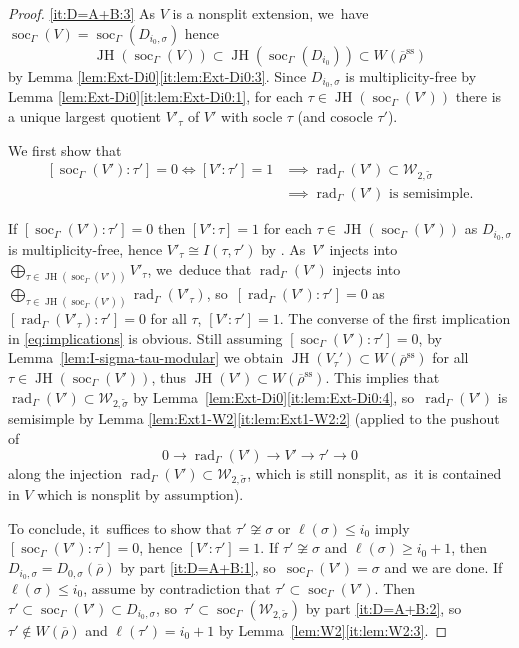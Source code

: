 \documentclass[JEP,XML,SOM,Unicode,NoFloatCountersInSection, NoEqCountersInSection,published]{cedram}
\let\wt\widetilde
\newcommand{\cW}{\mathcal{W}}
\renewcommand{\ss}{\mathrm{ss}}
\newcommand{\brho}{\overline{\rho}}
\DeclareMathOperator{\JH}{\mathrm{JH}}
\DeclareMathOperator{\rad}{rad}
\DeclareMathOperator{\soc}{soc}
\theoremstyle{plain}
\theoremstyle{definition}
\begin{document}
\begin{proof}
\eqref{it:D=A+B:3}
As $V$ is a nonsplit extension, we~have $\soc_{\Gamma}(V) = \soc_{\Gamma}(D_{i_0,\sigma})$ hence
\[
\JH(\soc_{\Gamma}(V)) \subset \JH(\soc_{\Gamma}(D_{i_0})) \subset W(\brho^\ss)
\]
by Lemma \ref{lem:Ext-Di0}\eqref{it:lem:Ext-Di0:3}.
Since $D_{i_0,\sigma}$ is multiplicity-free by Lemma \ref{lem:Ext-Di0}\eqref{it:lem:Ext-Di0:1}, for each $\tau\in \JH(\soc_{\Gamma}(V'))$ there is a unique largest quotient $V'_{\tau}$ of $V'$ with socle $\tau$ (and cosocle $\tau'$).

We first show that
\begin{equation}
\label{eq:implications}
\begin{aligned}
{}[\soc_{\Gamma}(V'):\tau'] = 0 \iff [V':\tau'] = 1
&\implies\rad_{\Gamma}(V') \subset \mathcal{W}_{2,\wt\sigma}\\
&\implies\text{$\rad_{\Gamma}(V')$ is semisimple}.
\end{aligned}
\end{equation}

If $[\soc_{\Gamma}(V'):\tau'] = 0$ then $[V':\tau]=1$ for each $\tau \in \JH(\soc_{\Gamma}(V'))$ as $D_{i_0,\sigma}$ is multiplicity-free, hence $V'_\tau \cong I(\tau,\tau')$ by \cite[Cor.\,3.12]{BP}. As~$V'$ injects into $\bigoplus_{\tau\in\JH(\soc_{\Gamma}(V'))} V'_{\tau}$, we~deduce that $\rad_{\Gamma}(V')$ injects into $\bigoplus_{\tau\in\JH(\soc_{\Gamma}(V'))} \rad_{\Gamma}(V'_{\tau})$, so~$[\rad_{\Gamma}(V'):\tau'] = 0$ as $[\rad_{\Gamma}(V'_\tau):\tau'] = 0$ for all $\tau$, \ie $[V':\tau'] = 1$.
The converse of the first implication in \eqref{eq:implications} is obvious.
Still assuming $[\soc_{\Gamma}(V'):\tau'] = 0$, by Lemma~\ref{lem:I-sigma-tau-modular} we obtain $\JH(V_{\tau}')\subset W(\brho^\ss)$ for all $\tau \in \JH(\soc_{\Gamma}(V'))$, thus $\JH(V')\subset W(\brho^\ss)$.
This implies that $\rad_{\Gamma}(V') \subset \mathcal{W}_{2,\wt\sigma}$ by Lemma~\ref{lem:Ext-Di0}\eqref{it:lem:Ext-Di0:4}, so~$\rad_{\Gamma}(V')$ is semisimple by Lemma \ref{lem:Ext1-W2}\eqref{it:lem:Ext1-W2:2} (applied to the pushout of
\[
0 \to \rad_{\Gamma}(V') \to V' \to \tau' \to 0
\]
along the injection $\rad_{\Gamma}(V') \subset \mathcal{W}_{2,\wt\sigma}$, which is still nonsplit, as~it is contained in $V$ which is nonsplit by assumption).

To conclude, it~suffices to show that $\tau' \not\cong \sigma$ or $\ell(\sigma) \le i_0$ imply $[\soc_{\Gamma}(V'):\tau'] = 0$, hence $[V':\tau'] = 1$.
If $\tau' \not\cong \sigma$ and $\ell(\sigma) \ge i_0+1$, then $D_{i_0,\sigma} = D_{0,\sigma}(\brho)$ by part \eqref{it:D=A+B:1}, so~$\soc_{\Gamma}(V') = \sigma$ and we are done.
If $\ell(\sigma) \le i_0$, assume by contradiction that $\tau' \subset \soc_{\Gamma}(V')$.
Then $\tau' \subset \soc_{\Gamma}(V') \subset D_{i_0,\sigma}$, so~$\tau' \subset \soc_{\Gamma}(\cW_{2,\wt\sigma})$ by part \eqref{it:D=A+B:2}, so~$\tau' \notin W(\brho)$ and $\ell(\tau')=i_0+1$ by Lemma~\ref{lem:W2}\eqref{it:lem:W2:3}.


\end{proof}
\end{document}
